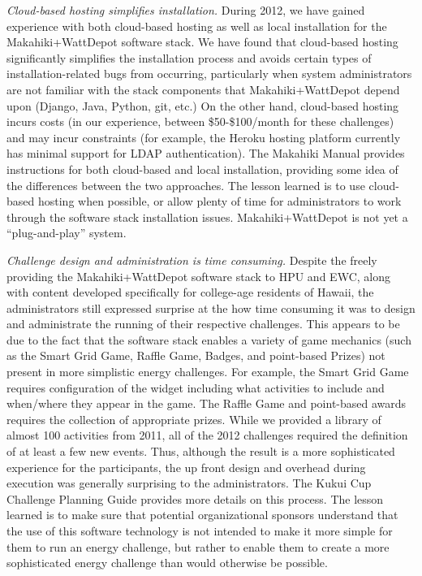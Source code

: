 {\em Cloud-based hosting simplifies installation.}  During 2012, we have gained experience with both cloud-based hosting as well as local installation for the Makahiki+WattDepot software stack.  We have found that cloud-based hosting significantly simplifies the installation process and avoids certain types of installation-related bugs from occurring, particularly when system administrators are not familiar with the stack components that Makahiki+WattDepot depend upon (Django, Java, Python, git, etc.)  On the other hand, cloud-based hosting incurs costs (in our experience, between \$50-\$100/month for these challenges) and may incur constraints (for example, the Heroku hosting platform currently has minimal support for LDAP authentication).  The Makahiki Manual \cite{MakahikiManual} provides instructions for both cloud-based and local installation, providing some idea of the differences between the two approaches.  The lesson learned is to use cloud-based hosting when possible, or allow plenty of time for administrators to work through the software stack installation issues. Makahiki+WattDepot is not yet a ``plug-and-play'' system.

{\em Challenge design and administration is time consuming.} Despite the freely providing the Makahiki+WattDepot software stack to HPU and EWC, along with content developed specifically for college-age residents of Hawaii, the administrators still expressed surprise at the how time consuming it was to design and administrate the running of their respective challenges.  This appears to be due to the fact that the software stack enables a variety of game mechanics (such as the Smart Grid Game, Raffle Game, Badges, and point-based Prizes) not present in more simplistic energy challenges.  For example, the Smart Grid Game requires configuration of the widget including what activities to include and when/where they appear in the game.  The Raffle Game and point-based awards requires the collection of appropriate prizes. While we provided a library of almost 100 activities from 2011, all of the 2012 challenges required the definition of at least a few new events.  Thus, although the result is a more sophisticated experience for the participants, the up front design and overhead during execution was generally surprising to the administrators. The Kukui Cup Challenge Planning Guide \cite{KukuiCupChallengePlanningGuide} provides more details on this process.  The lesson learned is to make sure that potential organizational sponsors understand that the use of this software technology is not intended to make it more simple for them to run an energy challenge, but rather to enable them to create a more sophisticated energy challenge than would otherwise be possible.

